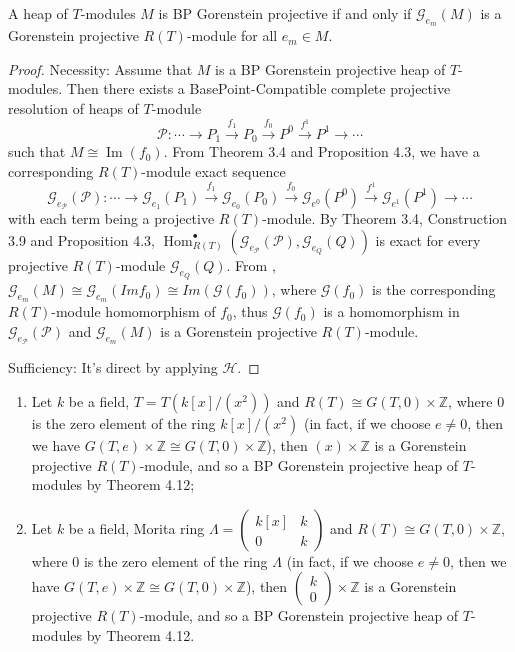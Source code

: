 \documentclass[11pt, twoside]{article}
\begin{document}
\begin{theorem}
A heap of $T$-modules $M$ is BP Gorenstein projective if and only if $\mathcal{G}_{e_m}(M)$ is a Gorenstein projective $R(T)$-module for all $e_m\in M$.
\end{theorem}
\begin{proof}
Necessity: Assume that $M$ is a BP Gorenstein projective heap of $T$-modules. Then there exists a BasePoint-Compatible complete projective resolution of heaps of $T$-module $$\mathcal{P}: \cdots \to P_1 \xrightarrow{f_1} P_0 \xrightarrow{f_0} P^0 \xrightarrow{f^1} P^1 \to \cdots$$ such that $M \cong \operatorname{Im}(f_0)$. From Theorem 3.4 and Proposition 4.3, we have a corresponding $R(T)$-module exact sequence
$$\mathcal{G}_{e_{\mathcal{P}}}(\mathcal{P}):\cdots \to \mathcal{G}_{e_1}(P_1) \xrightarrow{f_1} \mathcal{G}_{e_0}(P_0) \xrightarrow{f_0} \mathcal{G}_{e^0}(P^0) \xrightarrow{f^1} \mathcal{G}_{e^1}(P^1) \to \cdots $$
with each term being a projective $R(T)$-module. By Theorem 3.4, Construction 3.9 and Proposition 4.3, $\operatorname{Hom}^\bullet_{R(T)}(\mathcal{G}_{e_{\mathcal{P}}}(\mathcal{P}), \mathcal{G}_{e_Q}(Q))$ is exact for every projective $R(T)$-module $\mathcal{G}_{e_Q}(Q)$. From \cite[Remark 2.13]{mb}, $\mathcal{G}_{e_m}(M) \cong \mathcal{G}_{e_m}(Imf_0) \cong Im(\mathcal{G}(f_0))$, where $\mathcal{G}(f_0)$ is the corresponding $R(T)$-module homomorphism of $f_0$, thus $\mathcal{G}(f_0)$ is a homomorphism in $\mathcal{G}_{e_{\mathcal{P}}}(\mathcal{P})$ and $\mathcal{G}_{e_m}(M)$ is a Gorenstein projective $R(T)$-module.

Sufficiency: It's direct by applying $\mathcal{H}$.
\end{proof}

\begin{example}
\begin{enumerate}
    \item[(i)] Let $k$ be a field, $T= T(k[x]/(x^2))$ and $R(T) \cong G(T,0) \times \mathbb{Z}$, where $0$ is the zero element of the ring $k[x]/(x^2)$ (in fact, if we choose $e\neq 0$, then we have $G(T,e) \times \mathbb{Z} \cong G(T,0) \times \mathbb{Z}$), then $(x) \times \mathbb{Z}$ is a Gorenstein projective $R(T)$-module, and so a BP Gorenstein projective heap of $T$-modules by Theorem 4.12;
    \item[(ii)] Let $k$ be a field, Morita ring $
\Lambda = \begin{pmatrix}
k[x] & k \\
0 & k
\end{pmatrix}$ and $R(T) \cong G(T,0) \times \mathbb{Z}$, where $0$ is the zero element of the ring $\Lambda$ (in fact, if we choose $e\neq 0$, then we have $G(T,e) \times \mathbb{Z} \cong G(T,0) \times \mathbb{Z}$), then $
\begin{pmatrix}
k \\
0
\end{pmatrix}
 \times \mathbb{Z}$ is a Gorenstein projective $R(T)$-module, and so a BP Gorenstein projective heap of $T$-modules by Theorem 4.12.
\end{enumerate}
\end{example}
\end{document}
